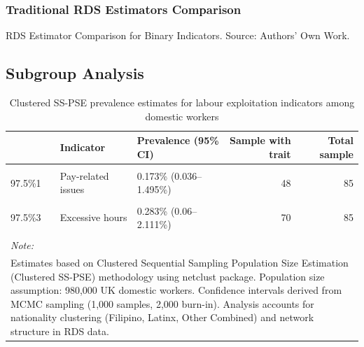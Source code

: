 \documentclass[
  12pt,
  letterpaper,
  DIV=11,
  numbers=noendperiod]{scrartcl}
\theoremstyle{plain}
\theoremstyle{definition}
\begin{document}
\subsubsection{Traditional RDS Estimators
Comparison}\label{traditional-rds-estimators-comparison}

\begin{table}

\caption{\label{tbl-rds-comparison}RDS Estimator Comparison for Binary
Indicators. Source: Authors' Own Work.}


\end{table}%

\subsection{Subgroup Analysis}\label{subgroup-analysis}

\begin{longtable}[t]{lllrr}
\caption{\label{tab:netclust-analysis2}Clustered SS-PSE prevalence estimates for labour exploitation indicators among domestic workers}\\
\toprule
 & Indicator & Prevalence (95\% CI) & Sample with trait & Total sample\\
\midrule
\cellcolor{gray!10}{97.5\%} & \cellcolor{gray!10}{Document withholding} & \cellcolor{gray!10}{0.084\% (0.018–0.732\%)} & \cellcolor{gray!10}{22} & \cellcolor{gray!10}{85}\\
97.5\%1 & Pay-related issues & 0.173\% (0.036–1.495\%) & 48 & 85\\
\cellcolor{gray!10}{97.5\%2} & \cellcolor{gray!10}{Threats/abuse} & \cellcolor{gray!10}{0.19\% (0.041–1.68\%)} & \cellcolor{gray!10}{51} & \cellcolor{gray!10}{85}\\
97.5\%3 & Excessive hours & 0.283\% (0.06–2.111\%) & 70 & 85\\
\cellcolor{gray!10}{97.5\%4} & \cellcolor{gray!10}{Limited access to help} & \cellcolor{gray!10}{0.183\% (0.038–1.59\%)} & \cellcolor{gray!10}{49} & \cellcolor{gray!10}{85}\\
\bottomrule
\multicolumn{5}{l}{\rule{0pt}{1em}\textit{Note: }}\\
\multicolumn{5}{l}{\rule{0pt}{1em}Estimates based on Clustered Sequential Sampling Population Size Estimation (Clustered SS-PSE) methodology using netclust package. Population size assumption: 980,000 UK domestic workers. Confidence intervals derived from MCMC sampling (1,000 samples, 2,000 burn-in). Analysis accounts for nationality clustering (Filipino, Latinx, Other Combined) and network structure in RDS data.}\\
\end{longtable}
\end{document}
